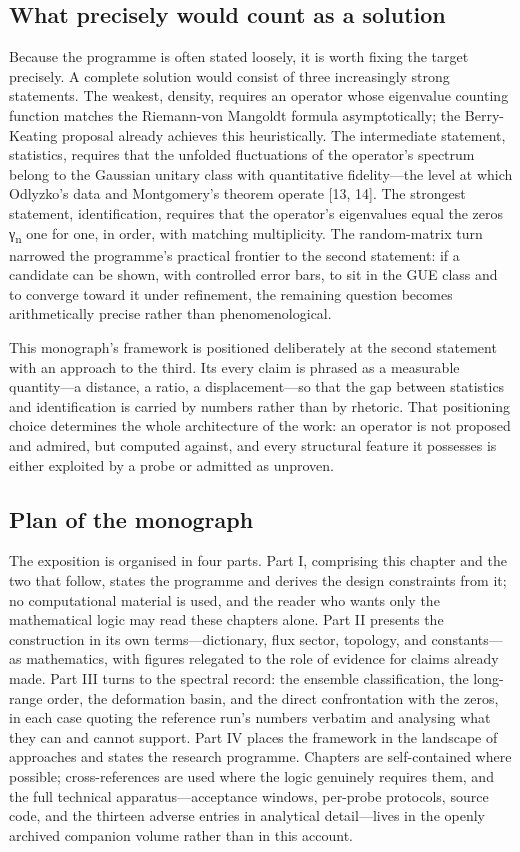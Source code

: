 \documentclass[10pt]{article}
\begin{document}
\subsection{What precisely would count as a solution}\label{sec:14}
Because the programme is often stated loosely, it is worth fixing the target precisely. A complete solution would consist of three increasingly strong statements. The weakest, density, requires an operator whose eigenvalue counting function matches the Riemann-von Mangoldt formula asymptotically; the Berry-Keating proposal already achieves this heuristically. The intermediate statement, statistics, requires that the unfolded fluctuations of the operator's spectrum belong to the Gaussian unitary class with quantitative fidelity---the level at which Odlyzko's data and Montgomery's theorem operate [13, 14]. The strongest statement, identification, requires that the operator's eigenvalues equal the zeros γ\textsubscript{n} one for one, in order, with matching multiplicity. The random-matrix turn narrowed the programme's practical frontier to the second statement: if a candidate can be shown, with controlled error bars, to sit in the GUE class and to converge toward it under refinement, the remaining question becomes arithmetically precise rather than phenomenological.

This monograph's framework is positioned deliberately at the second statement with an approach to the third. Its every claim is phrased as a measurable quantity---a distance, a ratio, a displacement---so that the gap between statistics and identification is carried by numbers rather than by rhetoric. That positioning choice determines the whole architecture of the work: an operator is not proposed and admired, but computed against, and every structural feature it possesses is either exploited by a probe or admitted as unproven.

\subsection{Plan of the monograph}\label{sec:15}
The exposition is organised in four parts. Part I, comprising this chapter and the two that follow, states the programme and derives the design constraints from it; no computational material is used, and the reader who wants only the mathematical logic may read these chapters alone. Part II presents the construction in its own terms---dictionary, flux sector, topology, and constants---as mathematics, with figures relegated to the role of evidence for claims already made. Part III turns to the spectral record: the ensemble classification, the long-range order, the deformation basin, and the direct confrontation with the zeros, in each case quoting the reference run's numbers verbatim and analysing what they can and cannot support. Part IV places the framework in the landscape of approaches and states the research programme. Chapters are self-contained where possible; cross-references are used where the logic genuinely requires them, and the full technical apparatus---acceptance windows, per-probe protocols, source code, and the thirteen adverse entries in analytical detail---lives in the openly archived companion volume rather than in this account.
\end{document}

